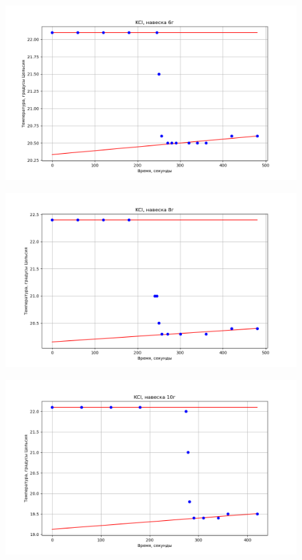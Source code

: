 \documentclass[a4paper, 12pt]{article}
\begin{document}
\begin{figure}[h!]
    \centering
    \includegraphics[width=150mm]{./pictures/3.png}
    \caption{}
\end{figure}
\begin{figure}[h!]
    \centering
    \includegraphics[width=150mm]{./pictures/4.png}
    \caption{}
\end{figure}

\newpage

\begin{figure}[h!]
    \centering
    \includegraphics[width=150mm]{./pictures/5.png}
    \caption{}
\end{figure}
\end{document}
